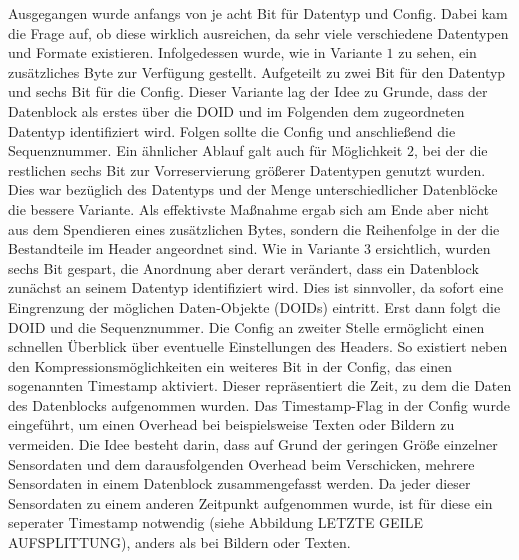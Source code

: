 Ausgegangen wurde anfangs von je acht Bit für Datentyp und Config.
Dabei kam die Frage auf, ob diese wirklich ausreichen, da sehr viele verschiedene Datentypen
und Formate existieren. Infolgedessen wurde, wie in Variante $1$ zu sehen, ein
zusätzliches Byte zur Verfügung gestellt. Aufgeteilt zu zwei Bit für den
Datentyp und sechs Bit für die Config. Dieser Variante lag der Idee zu Grunde,
dass der Datenblock als erstes über die DOID und im Folgenden dem
zugeordneten Datentyp identifiziert wird. Folgen sollte die Config und
anschließend die Sequenznummer. Ein ähnlicher Ablauf galt auch für Möglichkeit
$2$, bei der die restlichen sechs Bit zur Vorreservierung größerer Datentypen
genutzt wurden. Dies war bezüglich des Datentyps und der Menge unterschiedlicher
Datenblöcke die bessere Variante.  Als effektivste Maßnahme
ergab sich am Ende aber nicht aus dem Spendieren eines zusätzlichen Bytes,
sondern die Reihenfolge in der die Bestandteile im Header angeordnet sind. Wie
in Variante $3$ ersichtlich, wurden sechs Bit gespart, die Anordnung aber derart
verändert, dass ein Datenblock zunächst an seinem Datentyp identifiziert wird.
Dies ist sinnvoller, da sofort eine Eingrenzung der möglichen Daten-Objekte
(DOIDs) eintritt. Erst dann folgt die DOID und die Sequenznummer. Die Config
an zweiter Stelle ermöglicht einen schnellen Überblick über eventuelle
Einstellungen des Headers. So existiert neben den Kompressionsmöglichkeiten ein
weiteres Bit in der Config, das einen sogenannten Timestamp aktiviert. Dieser
repräsentiert die Zeit, zu dem die Daten des Datenblocks aufgenommen wurden. Das
Timestamp-Flag in der Config wurde eingeführt, um einen Overhead bei
beispielsweise Texten oder Bildern zu vermeiden. Die Idee besteht darin, dass
auf Grund der geringen Größe einzelner Sensordaten und dem darausfolgenden
Overhead beim Verschicken, mehrere Sensordaten in einem Datenblock
zusammengefasst werden. Da jeder dieser Sensordaten zu einem anderen Zeitpunkt
aufgenommen wurde, ist für diese ein seperater Timestamp notwendig (siehe
Abbildung LETZTE GEILE AUFSPLITTUNG), anders als bei Bildern oder Texten. 

